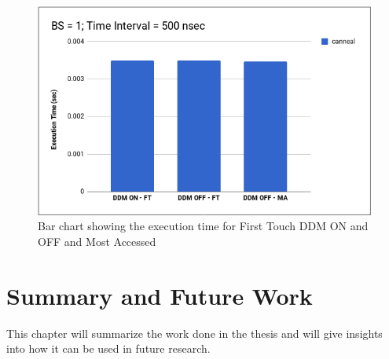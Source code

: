 \documentclass{listhesis}
\begin{document}
\begin{figure}
  \includegraphics[width=\linewidth]{FT_DDM_ON_OFF_CANN.png}
  \centering
  \caption{Bar chart showing the execution time for First Touch DDM ON and OFF and Most Accessed}
  \label{fig:FT_DDM_ON_OFF_CANN.png}
\end{figure}


\chapter{Summary and Future Work}
This chapter will summarize the work done in the thesis and will give insights into how it can be used in future research. 
\end{document}
